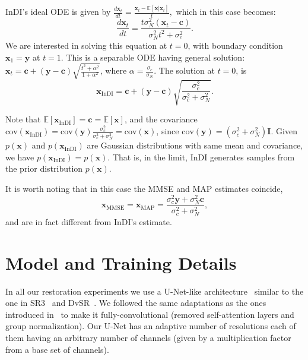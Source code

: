 \documentclass[10pt]{article} %
\begin{document}
InDI's ideal ODE is given by
$
\frac{d \textbf{x}_t} {dt} = \frac{\textbf{x}_t-\mathbb{E}[\textbf{x} | \textbf{x}_t]}{t},
$
which in this case becomes:
$$
\frac{ d\textbf{x}_t}{d t} = \frac{t \sigma^2_N (\textbf{x}_t-\textbf{c})}{\sigma^2_N t^2 + \sigma^2_c}.
$$
We are interested in solving this equation at $t=0$, with boundary condition $\textbf{x}_1=\textbf{y}$ at $t=1$.  This is a separable ODE having general solution: 
$\textbf{x}_t = \textbf{c} + (\textbf{y} - \textbf{c}) \sqrt{ \frac{t^2 + \alpha^2}{1 + \alpha^2}}$,
where $\alpha = \frac{\sigma_c}{\sigma_N}$. The solution at $t=0$, is
$$
\textbf{x}_\text{InDI} = \textbf{c} + (\textbf{y}-\textbf{c}) \sqrt{\frac{\sigma^2_c}{\sigma^2_c + \sigma^2_N}}.
$$

Note that $\mathbb{E}[\textbf{x}_\text{InDI}] = \textbf{c} = \mathbb{E}[\textbf{x}]$,
and the covariance $\text{cov}(\textbf{x}_\text{InDI}) = \text{cov}(\textbf{y}) \frac{\sigma^2_c}{\sigma^2_c + \sigma^2_N} = \text{cov}(\textbf{x})$,
since $\text{cov}(\textbf{y}) = (\sigma^2_c + \sigma^2_N)\textbf{I}.$ Given $p(\textbf{x})$ and $p(\textbf{x}_\text{InDI})$ are Gaussian distributions with same mean and covariance, we have $p(\textbf{x}_\text{InDI})=p (\textbf{x})$. That is, in the limit, InDI  generates samples from the prior distribution $p(\textbf{x})$. 

It is worth noting that in this case the MMSE and MAP estimates coincide, 
$$
\textbf{x}_\text{MMSE}  = \textbf{x}_\text{MAP} = \frac{\sigma^2_c \textbf{y} + \sigma^2_N \textbf{c}}{\sigma^2_c + \sigma^2_N}, 
$$
and are in fact different from InDI's estimate.










\section{Model and Training Details}
\label{app:model_training_details}

In all our restoration experiments we use a U-Net-like architecture~\citep{ronneberger2015u} similar to the one in SR3~\citep{saharia2021image} and DvSR~\citep{whang2022deblurring}.  We followed the same adaptations as the ones introduced in~\citet{whang2022deblurring} to make it fully-convolutional (removed self-attention layers and group normalization). Our U-Net has an adaptive number of resolutions each of them having an arbitrary number of channels (given by a multiplication factor from a base set of channels).
\end{document}
